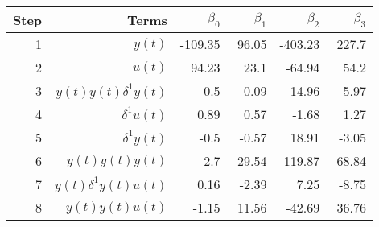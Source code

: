 \begin{tabular}{rrrrrr}
Step & Terms & $\beta_{0}$ & $\beta_{1}$ & $\beta_{2}$ & $\beta_{3}$ \\ 
\hline 
1 & $y(t)$ & -109.35 & 96.05 & -403.23 & 227.7 \\ 
2 & $u(t)$ & 94.23 & 23.1 & -64.94 & 54.2 \\ 
3 & $y(t)y(t)\delta^1 y(t)$ & -0.5 & -0.09 & -14.96 & -5.97 \\ 
4 & $\delta^1 u(t)$ & 0.89 & 0.57 & -1.68 & 1.27 \\ 
5 & $\delta^1 y(t)$ & -0.5 & -0.57 & 18.91 & -3.05 \\ 
6 & $y(t)y(t)y(t)$ & 2.7 & -29.54 & 119.87 & -68.84 \\ 
7 & $y(t)\delta^1 y(t)u(t)$ & 0.16 & -2.39 & 7.25 & -8.75 \\ 
8 & $y(t)y(t)u(t)$ & -1.15 & 11.56 & -42.69 & 36.76 \\ 
\hline 
\end{tabular}